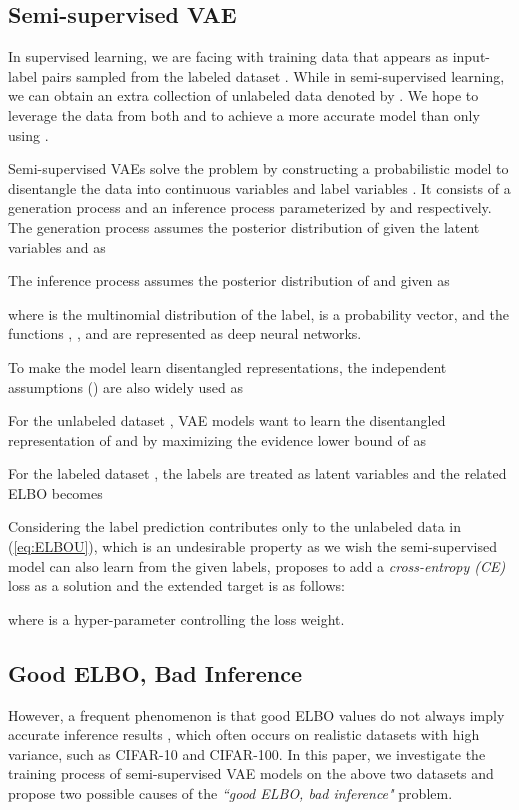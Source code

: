 \documentclass[letterpaper]{article}
\begin{document}
\subsection{Semi-supervised VAE}
In supervised learning, we are facing with training data that appears as input-label pairs  sampled from the labeled dataset . While in semi-supervised learning, we can obtain an extra collection of unlabeled data  denoted by . We hope to leverage the data from both  and  to achieve a more accurate model than only using . 

Semi-supervised VAEs \cite{DBLP:conf/nips/KingmaMRW14} solve the problem by constructing a probabilistic model to disentangle the data into continuous variables  and label variables . It consists of a generation process and an inference process parameterized by  and  respectively. The generation process assumes the posterior distribution of  given the latent variables  and  as 

The inference process assumes the posterior distribution of  and  given  as

where  is the multinomial distribution of the label,  is a probability vector, and the functions , ,  and  are represented as deep neural networks. 

To make the model learn disentangled representations, the independent assumptions (\citealt{DBLP:conf/nips/KingmaMRW14, DBLP:conf/nips/Dupont18}) are also widely used as 


For the unlabeled dataset , VAE models want to learn the disentangled representation of  and  by maximizing the evidence lower bound of  as


For the labeled dataset , the labels  are treated as latent variables and the related ELBO becomes


Considering the label prediction  contributes only to the unlabeled data in (\ref{eq:ELBOU}), which is an undesirable property as we wish the semi-supervised model can also learn from the given labels, \citet{DBLP:conf/nips/KingmaMRW14} proposes to add a \textit{cross-entropy (CE)} loss as a solution and the extended target is as follows:

where  is a hyper-parameter controlling the loss weight. 

\subsection{Good ELBO, Bad Inference}
However, a frequent phenomenon is that good ELBO values do not always imply accurate inference results \citep{DBLP:journals/corr/ZhaoSE17b}, which often occurs on realistic datasets with high variance, such as CIFAR-10 and CIFAR-100. In this paper, we investigate the training process of semi-supervised VAE models on the above two datasets and propose two possible causes of the \textit{``good ELBO, bad inference"} problem.
\end{document}

